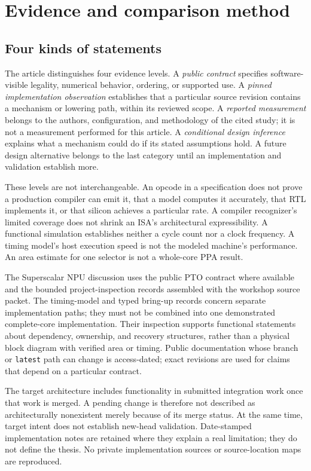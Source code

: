 \section{Evidence and comparison method}
\label{sec:method}

\subsection{Four kinds of statements}

The article distinguishes four evidence levels. A \emph{public contract} specifies software-visible legality, numerical behavior, ordering, or supported use. A \emph{pinned implementation observation} establishes that a particular source revision contains a mechanism or lowering path, within its reviewed scope. A \emph{reported measurement} belongs to the authors, configuration, and methodology of the cited study; it is not a measurement performed for this article. A \emph{conditional design inference} explains what a mechanism could do if its stated assumptions hold. A future design alternative belongs to the last category until an implementation and validation establish more.

These levels are not interchangeable. An opcode in a specification does not prove a production compiler can emit it, that a model computes it accurately, that RTL implements it, or that silicon achieves a particular rate. A compiler recognizer's limited coverage does not shrink an ISA's architectural expressibility. A functional simulation establishes neither a cycle count nor a clock frequency. A timing model's host execution speed is not the modeled machine's performance. An area estimate for one selector is not a whole-core PPA result.

The Superscalar NPU discussion uses the public PTO contract where available and the bounded project-inspection records assembled with the workshop source packet. The timing-model and typed bring-up records concern separate implementation paths; they must not be combined into one demonstrated complete-core implementation. Their inspection supports functional statements about dependency, ownership, and recovery structures, rather than a physical block diagram with verified area or timing. Public documentation whose branch or \texttt{latest} path can change is access-dated; exact revisions are used for claims that depend on a particular contract.

The target architecture includes functionality in submitted integration work once that work is merged. A pending change is therefore not described as architecturally nonexistent merely because of its merge status. At the same time, target intent does not establish new-head validation. Date-stamped implementation notes are retained where they explain a real limitation; they do not define the thesis. No private implementation sources or source-location maps are reproduced.

